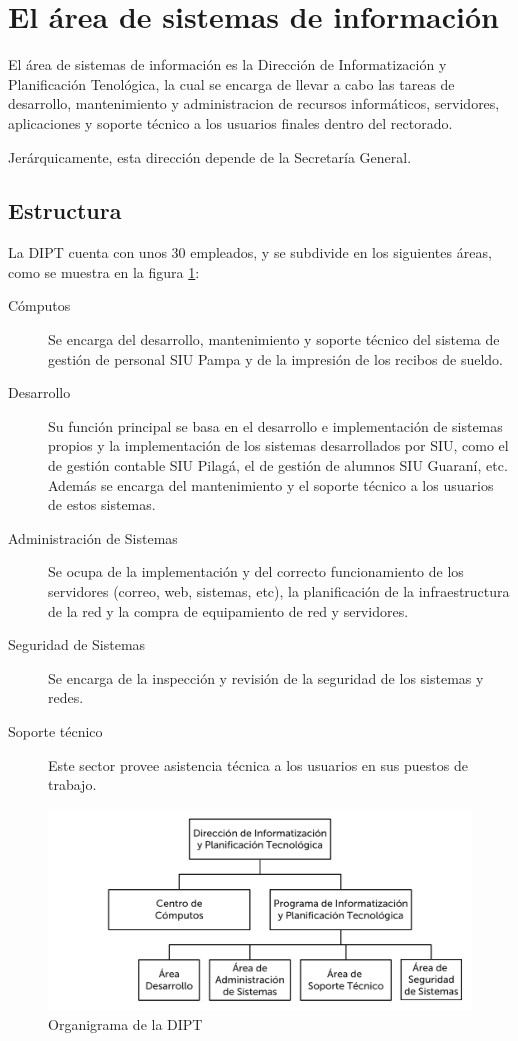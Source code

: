 \documentclass[a4paper,11pt,oneside]{article}
\begin{document}
%
\section{El área de sistemas de información}
%
El área de sistemas de información es la Dirección de Informatización
y Planificación Tenológica, la cual se encarga de llevar a cabo las
tareas de desarrollo, mantenimiento y administracion de recursos
informáticos, servidores, aplicaciones y soporte técnico a los
usuarios finales dentro del rectorado.

Jerárquicamente, esta dirección depende de la Secretaría General.
%
\subsection{Estructura}
%
La DIPT cuenta con unos 30 empleados, y se subdivide en los siguientes
áreas, como se muestra en la figura \ref{organi-dipt}:
\begin{description}
\item[Cómputos]
  Se encarga del desarrollo, mantenimiento y soporte técnico del
  sistema de gestión de personal SIU Pampa y de la impresión de los
  recibos de sueldo.
%
\item[Desarrollo]
  Su función principal se basa en el desarrollo e implementación de
  sistemas propios y la implementación de los sistemas desarrollados
  por SIU, como el de gestión contable SIU Pilagá, el de gestión de
  alumnos SIU Guaraní, etc. Además se encarga del mantenimiento y el
  soporte técnico a los usuarios de estos sistemas.
%
\item[Administración de Sistemas]
  Se ocupa de la implementación y del correcto funcionamiento de los
  servidores (correo, web, sistemas, etc), la planificación de la
  infraestructura de la red y la compra de equipamiento de red y
  servidores.
%
\item[Seguridad de Sistemas]
  Se encarga de la inspección y revisión de la seguridad de los
  sistemas y redes.
%
\item[Soporte técnico]
  Este sector provee asistencia técnica a los usuarios en sus puestos
  de trabajo.
\end{description}
%
\begin{figure}[H]
  \center\includegraphics[width=127mm]{img/organi_dipt}
  \caption{Organigrama de la DIPT}
  \label{organi-dipt}
\end{figure}
%
\end{document}
